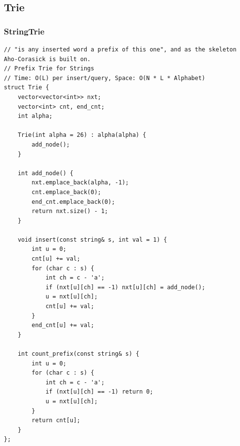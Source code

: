 \documentclass[9pt,a4paper,twocolumn]{extarticle}
\begin{document}
\subsection{Trie}

\filbreak
\subsubsection{StringTrie}
\nopagebreak
\begin{lstlisting}
// "is any inserted word a prefix of this one", and as the skeleton Aho-Corasick is built on.
// Prefix Trie for Strings
// Time: O(L) per insert/query, Space: O(N * L * Alphabet)
struct Trie {
    vector<vector<int>> nxt;
    vector<int> cnt, end_cnt;
    int alpha;

    Trie(int alpha = 26) : alpha(alpha) {
        add_node();
    }

    int add_node() {
        nxt.emplace_back(alpha, -1);
        cnt.emplace_back(0);
        end_cnt.emplace_back(0);
        return nxt.size() - 1;
    }

    void insert(const string& s, int val = 1) {
        int u = 0;
        cnt[u] += val;
        for (char c : s) {
            int ch = c - 'a';
            if (nxt[u][ch] == -1) nxt[u][ch] = add_node();
            u = nxt[u][ch];
            cnt[u] += val;
        }
        end_cnt[u] += val;
    }

    int count_prefix(const string& s) {
        int u = 0;
        for (char c : s) {
            int ch = c - 'a';
            if (nxt[u][ch] == -1) return 0;
            u = nxt[u][ch];
        }
        return cnt[u];
    }
};
\end{lstlisting}

\filbreak
\end{document}

